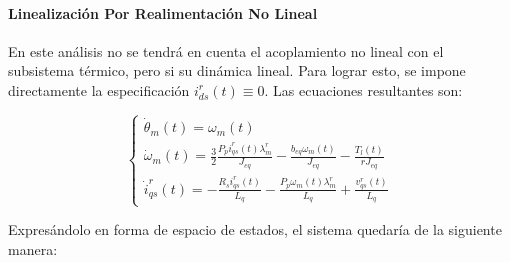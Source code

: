 \documentclass[a4paper, 10pt, onecolumn,journal]{ieeeconf}
\begin{document}
\paragraph{\textbf{Linealización Por Realimentación No Lineal}}
En este análisis no se tendrá en cuenta el acoplamiento no lineal con el subsistema térmico, pero si su dinámica lineal. Para lograr esto, se impone directamente la especificación $i^{r}_{ds}(t)\equiv0$. Las ecuaciones resultantes son:

\begin{equation}
	\begin{cases}
		\dot{\theta}_m(t) = {\omega}_m(t)\\
		\dot{\omega}_m(t) = \frac{3}{2} \frac{P_p i^r_{qs}(t)\lambda^r_m}{J_{eq}} - \frac{b_{eq}\omega_m(t)}{J_{eq}} - \frac{T_l(t)}{r J_{eq}}\\
		\dot{i}^r_{qs}(t) = -\frac{R_s i^r_{qs}(t)}{L_q} - \frac{P_p \omega_m(t) \lambda^r_m}{L_q}+ \frac{v^r_{qs}(t)}{L_q}
    \end{cases}
	\label{ecuacion con ids=0}
\end{equation}

Expresándolo en forma de espacio de estados, el sistema quedaría de la siguiente manera:
\end{document}
